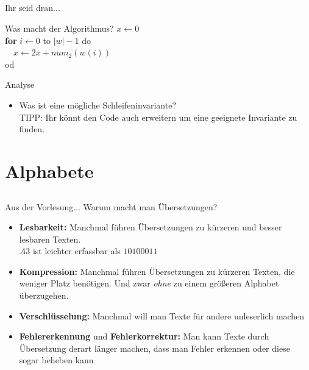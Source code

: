 \subsection*{}
\begin{frame}{Ihr seid dran...}
	\begin{block}{Was macht der Algorithmus?}
		 \only<2->{//Eingabe: $w \in Z_2^*$\\}
    $x \leftarrow 0$ \\
    \textbf{for} $i\leftarrow 0$ to $|w| -1$ do \\
    \ \ $x \leftarrow 2x + num_2(w(i))$ \\
    od
  \end{block}
  \begin{block}{Analyse}
  	\begin{itemize}
  		\item Was ist eine mögliche Schleifeninvariante? \\
  			TIPP: Ihr könnt den Code auch erweitern um eine geeignete Invariante zu finden. \\
  			\only<3->{Lsg.: $x = Num_2(v)$}
  	\end{itemize}
 \end{block}
\end{frame}


\section{Alphabete}
\subsection*{}


\begin{frame}{Aus der Vorlesung...}
	Warum macht man Übersetzungen? \pause
 \begin{itemize}
 \item \textbf{Lesbarkeit:} \pause Manchmal führen Übersetzungen zu kürzeren und
   besser lesbaren Texten.\\
   	 $A3$ ist leichter erfassbar als
   $10100011$
 \item \textbf{Kompression:}  \pause Manchmal führen Übersetzungen zu kürzeren
   Texten, die weniger Platz benötigen. Und zwar \emph{ohne} zu
   einem größeren Alphabet überzugehen.
 \item \textbf{Verschlüsselung:} \pause Manchmal will man Texte für andere unleserlich machen
 \item \textbf{Fehlererkennung} und \textbf{Fehlerkorrektur:} \pause Man kann Texte durch Übersetzung derart länger machen, dass man Fehler erkennen
 	oder diese sogar beheben kann
 \end{itemize}
\end{frame}


